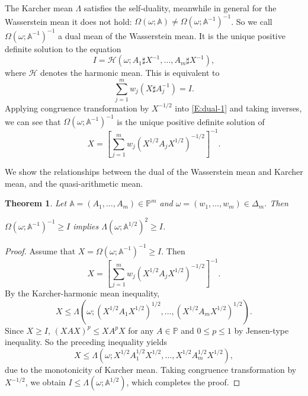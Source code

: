 \documentclass[12pt,reqno]{amsart}
\newtheorem{theorem}{Theorem}[section]
\begin{document}
The Karcher mean $\Lambda$ satisfies the self-duality, meanwhile in general for the Wasserstein mean it does not hold: $\Omega(\omega; \mathbb{A}) \neq \Omega(\omega; \mathbb{A}^{-1})^{-1}$.
So we call $\Omega(\omega; \mathbb{A}^{-1})^{-1}$ a dual mean of the Wasserstein mean.
It is the unique positive definite solution to the equation
\begin{displaymath}
I = \mathcal{H}(\omega; A_{1} \sharp X^{-1}, \dots, A_{m} \sharp X^{-1}),
\end{displaymath}
where $\mathcal{H}$ denotes the harmonic mean. This is equivalent to
\begin{equation} \label{E:dual-1}
\sum_{j=1}^{m} w_{j} (X \sharp A_{j}^{-1}) = I.
\end{equation}
Applying congruence transformation by $X^{-1/2}$ into \eqref{E:dual-1} and taking inverses, we can see that $\Omega(\omega; \mathbb{A}^{-1})^{-1}$ is the unique positive definite solution of
\begin{displaymath}
X = \left[ \sum_{j=1}^{m} w_{j} (X^{1/2} A_{j} X^{1/2})^{-1/2} \right]^{-1}.
\end{displaymath}

We show the relationships between the dual of the Wasserstein mean and Karcher mean, and the quasi-arithmetic mean.
\begin{theorem}
Let $\mathbb{A} = (A_{1}, \dots, A_{m}) \in \mathbb{P}^{m}$ and $\omega = (w_{1}, \dots, w_{m}) \in \Delta_{m}$. Then
\begin{center}
$\Omega(\omega; \mathbb{A}^{-1})^{-1} \geq I$ \quad implies \quad $\Lambda(\omega; \mathbb{A}^{1/2})^{2} \geq I$.
\end{center}
\end{theorem}

\begin{proof}
Assume that $X = \Omega(\omega; \mathbb{A}^{-1})^{-1} \geq I$. Then
\begin{displaymath}
X = \left[ \sum_{j=1}^{m} w_{j} (X^{1/2} A_{j} X^{1/2})^{-1/2} \right]^{-1}.
\end{displaymath}
By the Karcher-harmonic mean inequality,
\begin{displaymath}
X \leq \Lambda (\omega; (X^{1/2} A_{1} X^{1/2})^{1/2}, \dots, (X^{1/2} A_{m} X^{1/2})^{1/2}).
\end{displaymath}
Since $X \geq I$, $(X A X)^{p} \leq X A^{p} X$ for any $A \in \mathbb{P}$ and $0 \leq p \leq 1$ by Jensen-type inequality. So the preceding inequality yields
\begin{displaymath}
X \leq \Lambda (\omega; X^{1/2} A_{1}^{1/2} X^{1/2}, \dots, X^{1/2} A_{m}^{1/2} X^{1/2}),
\end{displaymath}
due to the monotonicity of Karcher mean. Taking congruence transformation by $X^{-1/2}$, we obtain $I \leq \Lambda(\omega; \mathbb{A}^{1/2})$, which completes the proof.
\end{proof}
\end{document}
